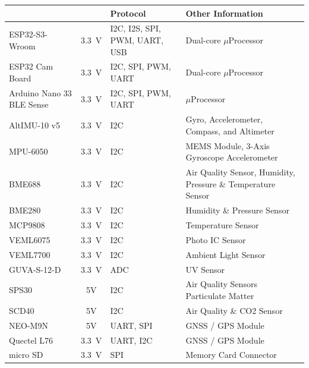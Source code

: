 \documentclass[11pt]{article}
\begin{document}
\begin{table}[htbp]
\centering
{}
\begin{tabularx}{0.95\textwidth}{>{\raggedright\arraybackslash}p{3.5cm}c>{\raggedright\arraybackslash}X>{\raggedright\arraybackslash}p{5.5cm}}
\hline
\rowcolor{CDOSRPrimary}
\textbf{\color{white!50}{Component}} & \textbf{\color{white!50}{Voltage}} & \textbf{\color{white!50}\textbf{Protocol}} & \textbf{\color{white!50}\textbf{Other Information}} \\ \hline
\rowcolors{2}{red}{}
ESP32-S3-Wroom & \SI{3.3}{\volt} & I2C, I2S, SPI, PWM, UART, USB & {Dual-core $\mu$Processor}\\ %
\rowcolor{LightCyan1!50}ESP32 Cam Board & \SI{3.3}{\volt} & I2C, SPI, PWM, UART & {Dual-core $\mu$Processor}\\ %
Arduino Nano 33 BLE Sense & \SI{3.3}{\volt} & I2C, SPI, PWM, UART & {$\mu$Processor}\\ %
\rowcolor{LightCyan1!50}AltIMU-10 v5 & \SI{3.3}{\volt} & I2C & Gyro, Accelerometer, Compass, and Altimeter\\ %
MPU-6050 & \SI{3.3}{\volt} & I2C & MEMS Module, 3-Axis Gyroscope\/ Accelerometer\\ %
\rowcolor{LightCyan1!50}BME688 & \SI{3.3}{\volt} & I2C & Air Quality Sensor, Humidity, Pressure \& Temperature Sensor\\ %
BME280 & \SI{3.3}{\volt} & I2C & Humidity \& Pressure Sensor\\ %
\rowcolor{LightCyan1!50}MCP9808 & \SI{3.3}{\volt} & I2C & Temperature Sensor\\ %
VEML6075 & \SI{3.3}{\volt} & I2C & Photo IC Sensor\\ %
\rowcolor{LightCyan1!50}VEML7700 & \SI{3.3}{\volt} & I2C & Ambient Light Sensor\\ %
GUVA-S-12-D & \SI{3.3}{\volt} & ADC & UV Sensor\\ %
\rowcolor{LightCyan1!50}SPS30 & 5V & I2C & Air Quality Sensors Particulate Matter \\ %
SCD40 & 5V & I2C & Air Quality \& CO2 Sensor\\ %
\rowcolor{LightCyan1!50}NEO-M9N & 5V & UART, SPI & GNSS / GPS Module\\ %
Quectel L76 & \SI{3.3}{\volt} & UART, I2C & GNSS / GPS Module\\ %
\rowcolor{LightCyan1!50}micro SD & \SI{3.3}{\volt} & SPI & Memory Card Connector\\ %

\end{tabularx}
\end{table}
\end{document}

